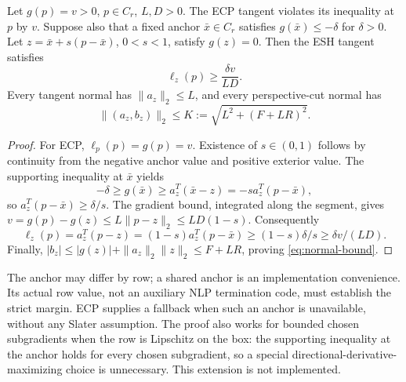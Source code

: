 \begin{lemma}\label{lem:margin}
Let $g(p)=v>0$, $p\in C_r$, $L,D>0$. The ECP tangent violates its inequality at $p$ by $v$. Suppose also that a fixed anchor $\bar x\in C_r$ satisfies $g(\bar x)\le-\delta$ for $\delta>0$. Let $z=\bar x+s(p-\bar x)$, $0<s<1$, satisfy $g(z)=0$. Then the ESH tangent satisfies
\begin{equation}\label{eq:margin}
 \ell_z(p)\ge\frac{\delta v}{LD}.
\end{equation}
Every tangent normal has $\|a_z\|_2\le L$, and every perspective-cut normal has
\begin{equation}\label{eq:normal-bound}
 \|(a_z,b_z)\|_2\le K:=\sqrt{L^2+(F+LR)^2}.
\end{equation}
\end{lemma}
\begin{proof}
For ECP, $\ell_p(p)=g(p)=v$. Existence of $s\in(0,1)$ follows by continuity from the negative anchor value and positive exterior value. The supporting inequality at $\bar x$ yields
\[
 -\delta\ge g(\bar x)\ge a_z^T(\bar x-z)=-s a_z^T(p-\bar x),
\]
so $a_z^T(p-\bar x)\ge\delta/s$. The gradient bound, integrated along the segment, gives
$v=g(p)-g(z)\le L\|p-z\|_2\le LD(1-s)$. Consequently
\[
 \ell_z(p)=a_z^T(p-z)=(1-s)a_z^T(p-\bar x)
 \ge(1-s)\delta/s\ge\delta v/(LD).
\]
Finally, $|b_z|\le|g(z)|+\|a_z\|_2\|z\|_2\le F+LR$, proving \eqref{eq:normal-bound}.
\end{proof}
The anchor may differ by row; a shared anchor is an implementation convenience. Its actual row value, not an auxiliary NLP termination code, must establish the strict margin. ECP supplies a fallback when such an anchor is unavailable, without any Slater assumption. The proof also works for bounded chosen subgradients when the row is Lipschitz on the box: the supporting inequality at the anchor holds for every chosen subgradient, so a special directional-derivative-maximizing choice is unnecessary. This extension is not implemented.

